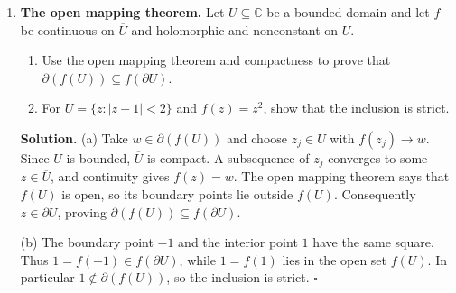 \documentclass[11pt,reqno]{amsart}
\newcommand{\C}{\mathbb{C}}
\newenvironment{solution}
  {\par\smallskip\begin{tcolorbox}[breakable,enhanced,colback=solblue,colframe=solframe,
   boxrule=0.5pt,arc=2pt,left=6pt,right=6pt,top=4pt,bottom=4pt]\setlength{\abovedisplayskip}{7pt}\setlength{\belowdisplayskip}{7pt}\noindent\textbf{Solution.}}
  {\hfill$\square$\end{tcolorbox}\par\medskip}
\begin{document}
\begin{enumerate}
\begin{solution}
Let $|w_0|<1$. We want a solution of $f(z)=w_0$ with $z\in D$.
In both parts it suffices to show that $f$ has a zero in $D$. Indeed,
on the unit circle $|w_0|<1\le|f(z)|$, so Rouch\'e's theorem gives
the same number of zeros in $D$ for $f-w_0$ and for $f$.

\smallskip
(a) As usual, take $f$ to be nonconstant on the component containing
$\overline D$. The maximum modulus principle gives $|f|<1$ in $D$.
If $f$ had no zero there, $1/f$ would be holomorphic in $D$, continuous
on $\overline D$, and of modulus $1$ on the boundary. The maximum
modulus principle applied to $1/f$ would give $|f|\ge1$ throughout $D$,
a contradiction. Thus $f$ has the required zero.

\smallskip
(b) Again suppose $f$ has no zero in $D$. Now $|1/f|\le1$ on the
boundary, hence throughout $D$. At $z_0$ we would have
$|1/f(z_0)|>1$. This contradiction proves the claim.

\smallskip
\emph{On the hypothesis in (a).} If the open set is disconnected,
nonconstancy on that set alone is insufficient. For example, take $f=1$
on $|z|<2$ and $f=0$ on $|z-4|<1$. Then $f(D)=\{1\}$.
\end{solution}

\item \textbf{The open mapping theorem.}
Let $U\subseteq\C$ be a bounded domain and let $f$ be continuous on
$\overline U$ and holomorphic and nonconstant on $U$.
\begin{enumerate}
\item Use the open mapping theorem and compactness to prove that
$\partial(f(U))\subseteq f(\partial U)$.
\item For $U=\{z:|z-1|<2\}$ and $f(z)=z^2$, show that the inclusion is strict.
\end{enumerate}

\begin{solution}
(a) Take $w\in\partial(f(U))$ and choose $z_j\in U$ with $f(z_j)\to w$.
Since $U$ is bounded, $\overline U$ is compact. A subsequence of $z_j$
converges to some $z\in\overline U$, and continuity gives $f(z)=w$.
The open mapping theorem says that $f(U)$ is open, so its boundary
points lie outside $f(U)$. Consequently $z\in\partial U$, proving
$\partial(f(U))\subseteq f(\partial U)$.

\smallskip
(b) The boundary point $-1$ and the interior point $1$ have the same
square. Thus $1=f(-1)\in f(\partial U)$, while $1=f(1)$ lies in the
open set $f(U)$. In particular $1\notin\partial(f(U))$, so the
inclusion is strict.
\end{solution}

\end{enumerate}
\end{document}
